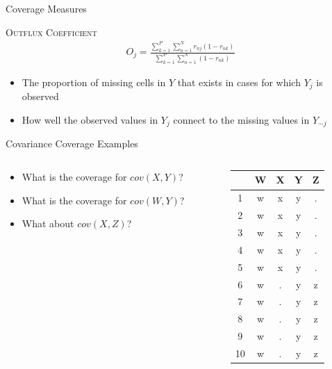 \documentclass{beamer}\usepackage[]{graphicx}\usepackage[]{color}
\newcommand{\rmsc}[1]{\textrm{\textsc{#1}}}
\begin{document}
\begin{frame}[allowframebreaks]{Coverage Measures}
  \pagebreak
  
  \rmsc{Outflux Coefficient}
  \begin{align*}
    O_j = \frac{\sum_{k = 1}^P \sum_{n = 1}^N r_{nj}(1 - r_{nk})}{\sum_{k = 1}^P \sum_{n = 1}^N (1 - r_{nk})}
  \end{align*}
  \begin{itemize}
  \item The proportion of missing cells in $Y$ that exists in cases for which $Y_j$ is observed
  \item How well the observed values in $Y_j$ connect to the missing values in $Y_{-j}$
  \end{itemize}
  
\end{frame}

\watermarkoff %

\begin{frame}{Covariance Coverage Examples}
  
  \begin{columns}
    \begin{column}{0.5\textwidth}
      
      \begin{itemize}
      \item What is the coverage for $cov(X, Y)$?
        \vc
      \item What is the coverage for $cov(W, Y)$?
        \vc
      \item What about $cov(X, Z)$?
      \end{itemize}
      
    \end{column}
    \begin{column}{0.5\textwidth}
      
\begin{table}[ht]
\centering
\begin{tabular}{ccccc}
  \toprule
 & W & X & Y & Z \\ 
  \midrule
1 & w & x & y & . \\ 
  2 & w & x & y & . \\ 
  3 & w & x & y & . \\ 
  4 & w & x & y & . \\ 
  5 & w & x & y & . \\ 
  6 & w & . & y & z \\ 
  7 & w & . & y & z \\ 
  8 & w & . & y & z \\ 
  9 & w & . & y & z \\ 
  10 & w & . & y & z \\ 
   \bottomrule
\end{tabular}
\end{table}


\end{column}
\end{columns}
 
\end{frame}
\end{document}
